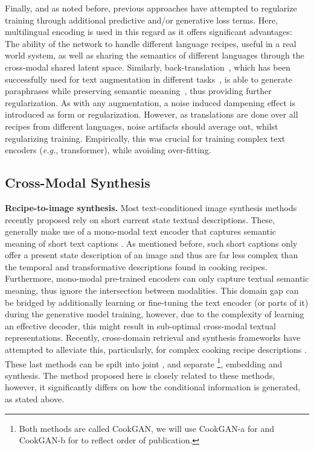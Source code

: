 \documentclass[sigconf,nonacm]{acmart}
\def\eg{\emph{e.g.}} \def\Eg{\emph{E.g.}}
\begin{document}
Finally, and as noted before, previous approaches have attempted to regularize training through additional predictive and/or generative loss terms. Here, multilingual encoding is used in this regard as it offers significant advantages: The ability of the network to handle different language recipes, useful in a real world system, as well as sharing the semantics of different languages through the cross-modal shared latent space. Similarly, back-translation~\cite{sennrich2016}, which has been successfully used for text augmentation in different tasks~\cite{sennrich2016,xie2020}, is able to generate paraphrases while preserving semantic meaning~\cite{xie2020}, thus providing further regularization. As with any augmentation, a noise induced dampening effect is introduced as form or regularization. However, as translations are done over all recipes from different languages, noise artifacts should average out, whilst regularizing training. Empirically, this was crucial for training complex text encoders (\eg, transformer), while avoiding over-fitting.


\subsection{Cross-Modal Synthesis}
\noindent\textbf{Recipe-to-image synthesis.}
Most text-conditioned image synthesis methods recently proposed rely on short current state textual descriptions. These, generally make use of a mono-modal text encoder that captures semantic meaning of short text captions \cite{reed16,han2017stackgan,Xu_2018_CVPR,Zhu_2019_CVPR}. As mentioned before, such short captions only offer a present state description of an image and thus are far less complex than the temporal and transformative descriptions found in cooking recipes. Furthermore, mono-modal pre-trained encoders can only capture textual semantic meaning, thus ignore the intersection between modalities. This domain gap can be bridged by additionally learning or fine-tuning the text encoder (or parts of it) during the generative model training, however, due to the complexity of learning an effective decoder, this might result in sub-optimal cross-modal textual representations. Recently, cross-domain retrieval and synthesis frameworks have attempted to alleviate this, particularly, for complex cooking recipe descriptions \cite{wang2019,Zhu2019,Han2020,zhu2020}. These last methods can be spilt into joint \cite{wang2019,Zhu2019}, and separate \cite{Han2020,zhu2020}\footnote{Both \cite{Han2020,zhu2020} methods are called CookGAN, we will use CookGAN-a for \cite{Han2020} and CookGAN-b for \cite{zhu2020} to reflect order of publication.}, embedding and synthesis. The method proposed here is closely related to these methods, however, it significantly differs on how the conditional information is generated, as stated above.
\end{document}
